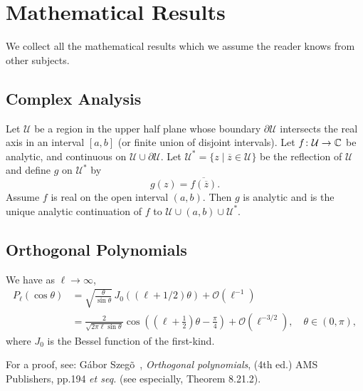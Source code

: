 \chapter{Mathematical Results}

\M
We collect all the mathematical results which we assume the reader knows
from other subjects.

\section{Complex Analysis}

\begin{lemma}
Let $\mathcal{U}$ be a region in the upper half plane whose boundary
$\partial\mathcal{U}$ intersects the real axis in an interval $[a,b]$
(or finite union of disjoint intervals). Let $f\colon\mathcal{U}\to\mathbb{C}$
be analytic, and continuous on $\mathcal{U}\cup\partial\mathcal{U}$.
Let $\mathcal{U}^{*}=\{z\mid\overline{z}\in\mathcal{U}\}$ be the
reflection of $\mathcal{U}$ and define $g$ on $\mathcal{U}^{*}$ by
\begin{equation}
g(z) = \overline{f(\overline{z})}.
\end{equation}
Assume $f$ is real on the open interval $(a,b)$. Then $g$ is analytic
and is the unique analytic continuation of $f$ to
$\mathcal{U}\cup(a,b)\cup\mathcal{U}^{*}$. 
\end{lemma}

\section{Orthogonal Polynomials}

\begin{lemma}
We have as $\ell\to\infty$,
\begin{subequations}
  \begin{align}
  P_\ell (\cos \theta) &= \sqrt{\frac{\theta}{\sin \theta}} \, J_0((\ell+1/2)\theta) + \mathcal{O}\left(\ell^{-1}\right) \\
&= \frac{2}{\sqrt{2\pi \ell\sin\theta}}\cos\left(\left(\ell + \tfrac12\right)\theta - \frac{\pi}{4}\right) + \mathcal{O}\left(\ell^{-3/2}\right), \quad \theta \in (0,\pi),
\end{align}
\end{subequations}
where $J_{0}$ is the Bessel function of the first-kind.
\end{lemma}

For a proof, see:
G\'abor Szeg\~o~\cite{szego},
\emph{Orthogonal polynomials}, (4th ed.) AMS Publishers, pp.194
\emph{et seq.} (see especially, Theorem 8.21.2).
